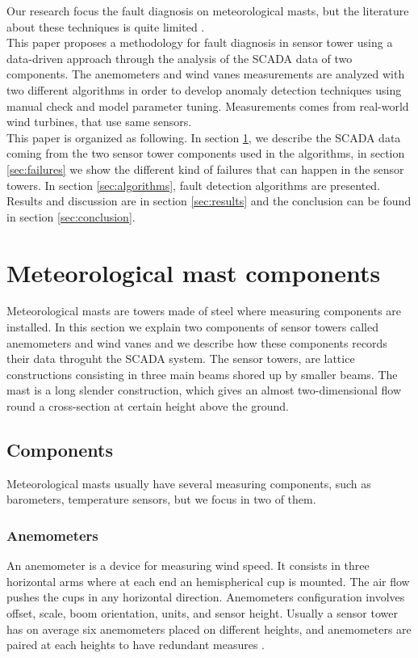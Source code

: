 \documentclass[conference]{IEEEtran}
\begin{document}
Our research focus the fault diagnosis on meteorological masts,   
but the literature about these techniques is quite limited \cite{hasu2006weather} .\\
This paper proposes a methodology for fault diagnosis in sensor tower using a data-driven approach through the analysis of the SCADA data of two components. The anemometers and wind vanes measurements are analyzed with two different algorithms in order to develop anomaly detection techniques using manual check and model parameter tuning. Measurements comes from real-world wind turbines, that use same sensors.  \\
This paper is organized as following. In section \ref{sec:sensortower}, we describe the SCADA data coming from the two sensor tower components used in the algorithms, in section \ref{sec:failures} we show the different kind of failures that can happen in the sensor towers. In section \ref{sec:algorithms}, fault detection algorithms are presented. Results and discussion are in section \ref{sec:results} and the conclusion can be found in section \ref{sec:conclusion}.

\section{Meteorological mast components}\label{sec:sensortower}
Meteorological masts are towers made of steel where measuring components are installed. In this section we explain two components of sensor towers called anemometers and wind vanes and we describe how these components records their data throguht the SCADA system.
The sensor towers, are  lattice constructions consisting in three main beams shored up by smaller beams. The mast is a long slender construction, which gives an almost two-dimensional flow round a cross-section at certain height above the ground. 

\subsection{Components}
Meteorological masts usually have several measuring components, such as barometers, temperature sensors, but we focus in two of them.
\subsubsection{Anemometers}
An anemometer is a device for measuring wind speed. It consists in three horizontal arms where at each end an hemispherical cup is mounted. The air flow pushes the cups in any horizontal direction. Anemometers configuration involves offset, scale, boom orientation, units, and sensor height. Usually a sensor tower has on average six anemometers placed on different heights, and  anemometers are paired at each heights to have redundant measures \cite{clifton2014135}.
\end{document}
